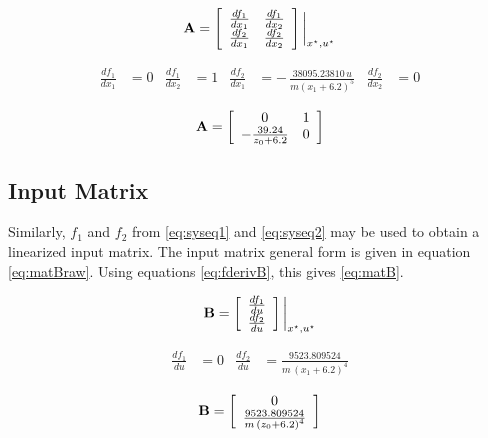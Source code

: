 \begin{equation}
	\label{eq:matAraw}
	{\bf A} = 
	\left[
		\begin{array}{cc}
			 {\frac {df_1}{dx_1}} & {\frac {df_1}{dx_2}} \\
			 {\frac {df_2}{dx_1}} & {\frac {df_2}{dx_2}} \\
		\end{array}
	\right]\bigg|_{x^\star, u^\star}
\end{equation}

\begin{align}
	\label{eq:fderivA}
	 {\frac {df_1}{dx_1}} &= 0 &  {\frac {df_1}{dx_2}} &=1 &  {\frac {df_2}{dx_1}} &= - \,{\frac {38095.23810\,u}{m\left( x_1 + 6.2 \right) ^{5}}} &  {\frac {df_2}{dx_2}} &=0
\end{align}

\begin{equation}
	\label{eq:matA}
	{\bf A} = 
	\left[
		\begin{array}{cc}
			 0 & 1 \\
			 -{\frac {39.24}{z_0 + 6.2}} & 0 \\
		\end{array}
	\right]
\end{equation}


\subsection{Input Matrix}

Similarly, $f_1$ and $f_2$ from \ref{eq:syseq1} and \ref{eq:syseq2} may be used to obtain a linearized input matrix.
The input matrix general form is given in equation \ref{eq:matBraw}.
Using equations \ref{eq:fderivB}, this gives \ref{eq:matB}.

\begin{equation}
	\label{eq:matBraw}
	{\bf B} = 
	\left[
		\begin{array}{c}
			 {\frac {df_1}{du}} \\
			 {\frac {df_2}{du}} \\
		\end{array}
	\right]\bigg|_{x^\star, u^\star}
\end{equation}

\begin{align}
	\label{eq:fderivB}
	 {\frac {df_1}{du}} &= 0 &  {\frac {df_2}{du}} &= {\frac {9523.809524}{m\,\left( x_1 + 6.2 \right) ^{4}}}
\end{align}

\begin{equation}
	\label{eq:matB}
	{\bf B} = 
	\left[
		\begin{array}{c}
			 0 \\
			{\frac {9523.809524}{m\,\left( z_0 + 6.2 \right) ^{4}}} \\
		\end{array}
	\right]
\end{equation}

